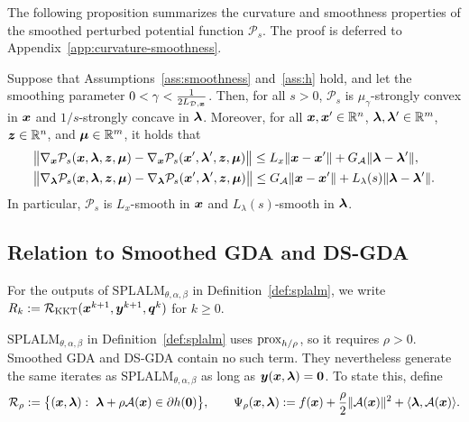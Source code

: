 The following proposition summarizes the curvature and smoothness properties
of the smoothed perturbed potential function $\mathcal P_s$.
The proof is deferred to Appendix~\ref{app:curvature-smoothness}.

\begin{proposition}
\label{prop:curvature-smoothness}
Suppose that Assumptions~\ref{ass:smoothness} and~\ref{ass:h} hold, and let the smoothing parameter  
$ 0 < \gamma < \frac{1}{2L_{\mathcal{D},\bm{x}}}$. Then, for all $s>0$, $\mathcal P_s$ is
$\mu_\gamma $-strongly convex in $\bm{x}$ and
$1/s$-strongly concave in $\bm{\lambda}$. Moreover, for all
$\bm{x},\bm{x}'\in\mathbb{R}^n$,
$\bm{\lambda},\bm{\lambda}'\in\mathbb{R}^m$,
$\bm{z}\in\mathbb{R}^n$, and
$\bm{\mu}\in\mathbb{R}^m$, it holds that 
\begin{align}
    &\bigl\|
    \nabla_{\bm{x}}\mathcal{P}_s(\bm{x},\bm{\lambda},\bm{z},\bm{\mu})
    -
    \nabla_{\bm{x}}\mathcal{P}_s(\bm{x}',\bm{\lambda}',\bm{z},\bm{\mu})
    \bigr\|
    \le
    L_x\|\bm{x}-\bm{x}'\|
    +
    G_{\mathcal{A}}\|\bm{\lambda}-\bm{\lambda}'\|,
    \label{eq:payoff-x-smoothness}
    \\
    &\bigl\|
    \nabla_{\bm{\lambda}}\mathcal{P}_s(\bm{x},\bm{\lambda},\bm{z},\bm{\mu})
    -
    \nabla_{\bm{\lambda}}\mathcal{P}_s(\bm{x}',\bm{\lambda}',\bm{z},\bm{\mu})
    \bigr\|
    \le
    G_{\mathcal{A}}\|\bm{x}-\bm{x}'\|
    +
    L_\lambda(s)\|\bm{\lambda}-\bm{\lambda}'\|
    \label{eq:payoff-lambda-smoothness}.
\end{align}
In particular, $\mathcal P_s$ is $L_x$-smooth in $\bm{x}$ and $L_\lambda(s)$-smooth in $\bm{\lambda}$.
\end{proposition}

\subsection{Relation to Smoothed GDA and DS-GDA}
\label{subsec:gda-embedding}

For the
outputs of \(\mathrm{SPLALM}_{\theta,\alpha,\beta}\) in
Definition~\ref{def:splalm}, we write
\(R_k:=\mathcal R_{\mathrm{KKT}}(\bm{x}^{k+1},\bm{y}^{k+1},\bm{q}^k)\) for
\(k\ge0\).

\(\mathrm{SPLALM}_{\theta,\alpha,\beta}\) in Definition~\ref{def:splalm} uses
\(\mathrm{prox}_{h/\rho}\), so it requires \(\rho>0\).
Smoothed GDA and DS-GDA contain no such term. They nevertheless generate the
same iterates as \(\mathrm{SPLALM}_{\theta,\alpha,\beta}\) as long as
\(\bm{y}(\bm{x},\bm{\lambda})=\bm{0}\). To state this, define
\[
\mathcal R_\rho:=\bigl\{(\bm{x},\bm{\lambda}):\ \bm{\lambda}+\rho\mathcal{A}(\bm{x})\in\partial h(\bm{0})\bigr\},
\qquad
\Psi_\rho(\bm{x},\bm{\lambda}):=f(\bm{x})+\frac{\rho}{2}\|\mathcal{A}(\bm{x})\|^2+\langle\bm{\lambda},\mathcal{A}(\bm{x})\rangle .
\]

